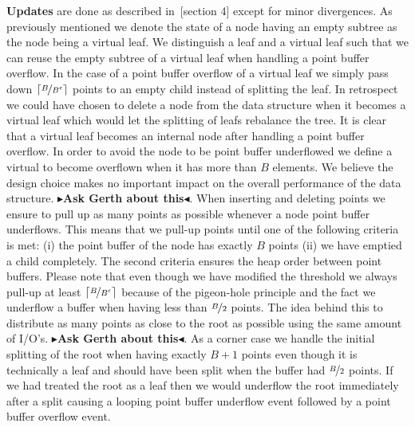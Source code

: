 \documentclass[twoside,11pt,openright]{report}
\newcommand{\todo}[1]{{\color[rgb]{.5,0,0}\textbf{$\blacktriangleright$#1$\blacktriangleleft$}}}
\begin{document}
\textbf{Updates} are done as described in~\cite{DBLP:journals/corr/Brodal15}[section 4] except for minor divergences. As previously mentioned we denote the state of a node having an empty subtree as the node being a virtual leaf. We distinguish a leaf and a virtual leaf such that we can reuse the empty subtree of a virtual leaf when handling a point buffer overflow. In the case of a point buffer overflow of a virtual leaf we simply pass down $\lceil \nicefrac{B}{B^{\epsilon}} \rceil$ points to an empty child instead of splitting the leaf. In retrospect we could have chosen to delete a node from the data structure when it becomes a virtual leaf which would let the splitting of leafs rebalance the tree. It is clear that a virtual leaf becomes an internal node after handling a point buffer overflow. In order to avoid the node to be point buffer underflowed we define a virtual to become overflown when it has more than $B$ elements. We believe the design choice makes no important impact on the overall performance of the data structure. \todo{Ask Gerth about this}. When inserting and deleting points we ensure to pull up as many points as possible whenever a node point buffer underflows. This means that we pull-up points until one of the following criteria is met: (i) the point buffer of the node has exactly $B$ points (ii) we have emptied a child completely. The second criteria ensures the heap order between point buffers. Please note that even though we have modified the threshold we always pull-up at least $\lceil \nicefrac{B}{B^{\epsilon}} \rceil$ because of the pigeon-hole principle and the fact we underflow a buffer when having less than $\nicefrac{B}{2}$ points. The idea behind this to distribute as many points as close to the root as possible using the same amount of I/O's. \todo{Ask Gerth about this}. As a corner case we handle the initial splitting of the root when having exactly $B+1$ points even though it is technically a leaf and should have been split when the buffer had $\nicefrac{B}{2}$ points. If we had treated the root as a leaf then we would underflow the root immediately after a split causing a looping point buffer underflow event followed by a point buffer overflow event.
\end{document}
